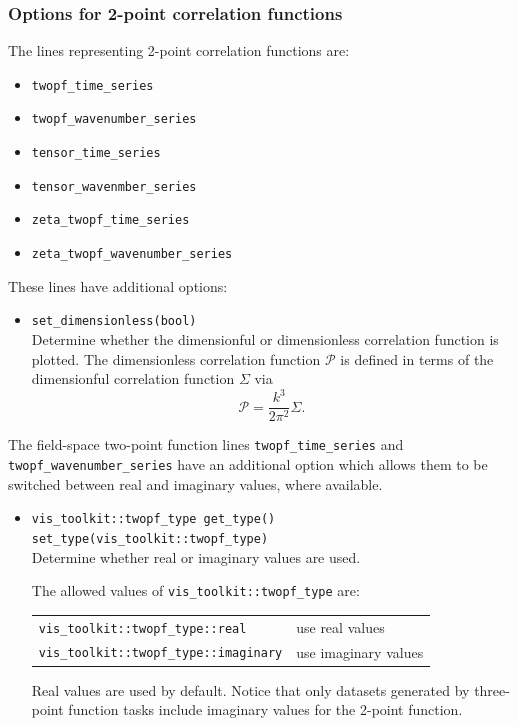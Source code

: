 \documentclass[11pt,a4paper]{article}
\newcommand{\DimlessSigma}{\mathcal{P}}
\begin{document}
\subsubsection{Options for 2-point correlation functions}
The lines representing 2-point correlation functions are:
\begin{itemize}
    \item \texttt{twopf_time_series}
    \item \texttt{twopf_wavenumber_series}
    \item \texttt{tensor_time_series}
    \item \texttt{tensor_wavenmber_series}
    \item \texttt{zeta_twopf_time_series}
    \item \texttt{zeta_twopf_wavenumber_series}
\end{itemize}
These lines
have additional options:
\begin{itemize}        
    \item \texttt{set_dimensionless(bool)} \\
    Determine whether the dimensionful or dimensionless correlation
    function is plotted.
    The dimensionless correlation function $\DimlessSigma$ is defined
    in terms of the dimensionful correlation function $\Sigma$
    via
    \begin{equation}
        \DimlessSigma = \frac{k^3}{2\pi^2} \Sigma .
    \end{equation}
\end{itemize}
The field-space two-point function lines
\texttt{twopf_time_series}
and \texttt{twopf_wavenumber_series} have an additional option which
allows them to be switched between
real and imaginary values, where available.
\begin{itemize}
    \item \texttt{vis_toolkit::twopf_type get_type()} \\
    \texttt{set_type(vis_toolkit::twopf_type)} \\
    Determine whether real or imaginary values are used.
    
    The allowed values
    of \texttt{vis_toolkit::twopf_type} are: \\
    \begin{tabular}{p{6.5cm}p{7.5cm}}
        \texttt{vis_toolkit::twopf_type::real} & use real values \\
        \texttt{vis_toolkit::twopf_type::imaginary} & use imaginary values    
    \end{tabular}
    Real values are used by default.
    Notice that only datasets generated by three-point function tasks
    include imaginary values for the 2-point function.
\end{itemize}
\end{document}
